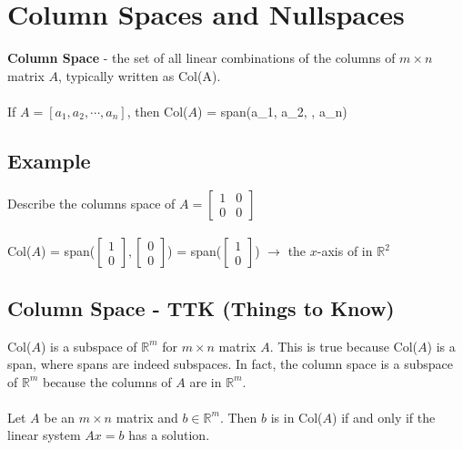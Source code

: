 \section{Column Spaces and Nullspaces}
\textbf{Column Space} - the set of all linear combinations of the columns of $m \times n$ matrix $A$,
typically written as Col(A). \\\\
If $A = [a_1, a_2, \cdots, a_n]$, then Col($A$) = span(a_1, a_2, \cdots, a_n)
\subsection{Example}
Describe the columns space of $A = \begin{bmatrix} 1 & 0 \\ 0 & 0 \end{bmatrix}$ \\\\
Col($A$) = span($\begin{bmatrix} 1 \\ 0 \end{bmatrix}, \begin{bmatrix} 0 \\ 0 \end{bmatrix}$) = 
span($\begin{bmatrix} 1 \\ 0 \end{bmatrix}$) $\rightarrow$ the $x$-axis of in $\mathbb{R}^2$
\subsection{Column Space - TTK (Things to Know)}
Col($A$) is a subspace of $\mathbb{R}^m$ for $m \times n$ matrix $A$. This is true because Col($A$) is a span, where spans are indeed subspaces. In fact, the column space is a subspace of $\mathbb{R}^m$ because the columns of $A$ are in $\mathbb{R}^m$. \\\\
Let $A$ be an $m \times n$ matrix and $b \in \mathbb{R}^m$. Then $b$ is in Col($A$) if and only if the linear system $Ax = b$ has a solution. \\\\
